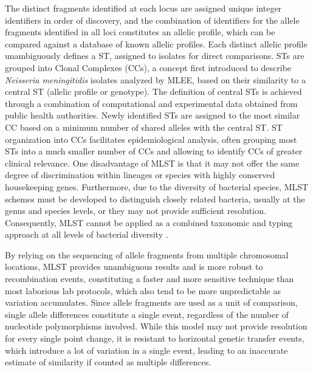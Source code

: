 The distinct fragments identified at each locus are assigned unique integer identifiers in order of discovery, and the combination of identifiers for the allele fragments identified in all loci constitutes an allelic profile, which can be compared against a database of known allelic profiles. Each distinct allelic profile unambiguously defines a \ac{ST}, assigned to isolates for direct comparisons. \ac{ST}s are grouped into Clonal Complexes (\acs{CC}s), a concept first introduced to describe \textit{Neisseria meningitidis} isolates analyzed by \ac{MLEE}, based on their similarity to a central \ac{ST} (allelic profile or genotype). The definition of central \ac{ST}s is achieved through a combination of computational and experimental data obtained from public health authorities. Newly identified \ac{ST}s are assigned to the most similar \acs{CC} based on a minimum number of shared alleles with the central \ac{ST}. \ac{ST} organization into \acs{CC}s facilitates epidemiological analysis, often grouping most \ac{ST}s into a much smaller number of \acs{CC}s and allowing to identify \acs{CC}s of greater clinical relevance. One disadvantage of \ac{MLST} is that it may not offer the same degree of discrimination within lineages or species with highly conserved housekeeping genes. Furthermore, due to the diversity of bacterial species, \ac{MLST} schemes must be developed to distinguish closely related bacteria, usually at the genus and species levels, or they may not provide sufficient resolution. Consequently, \ac{MLST} cannot be applied as a combined taxonomic and typing approach at all levels of bacterial diversity \cite{jolley_ribosomal_2012}.

By relying on the sequencing of allele fragments from multiple chromosomal locations, \ac{MLST} provides unambiguous results and is more robust to recombination events, constituting a faster and more sensitive technique than most laborious lab protocols, which also tend to be more unpredictable as variation accumulates. Since allele fragments are used as a unit of comparison, single allele differences constitute a single event, regardless of the number of nucleotide polymorphisms involved. While this model may not provide resolution for every single point change, it is resistant to horizontal genetic transfer events, which introduce a lot of variation in a single event, leading to an inaccurate estimate of similarity if counted as multiple differences.

